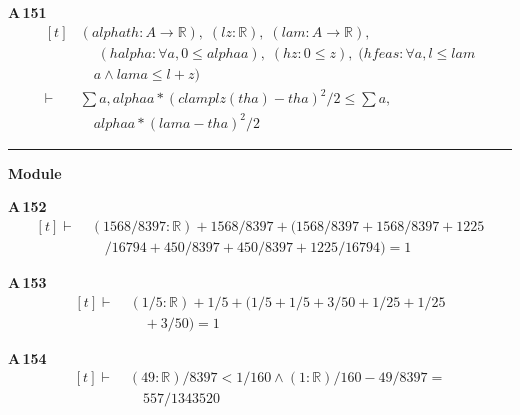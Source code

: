 \noindent\textbf{A\,151}\quad{}
{\footnotesize\[ \begin{aligned}[t]
&(\mathit{alpha} \mathit{th} : \mathit{A} \to \mathbb{R} ),\; (\mathit{l} \mathit{z} : \mathbb{R} ),\; (\mathit{lam} : \mathit{A} \to \mathbb{R} ),\\
&\quad \; (\mathit{halpha} : \forall \mathit{a}, 0 \leq \mathit{alpha} \mathit{a}),\; (\mathit{hz} : 0 \leq \mathit{z}),\; (\mathit{hfeas} : \forall \mathit{a}, \mathit{l} \leq \mathit{lam}\\
&\quad \mathit{a} \wedge \mathit{lam} \mathit{a} \leq \mathit{l} + \mathit{z})\\
\vdash\;&\textstyle\sum \mathit{a}, \mathit{alpha} \mathit{a} * (\mathit{clamp} \mathit{l} \mathit{z} (\mathit{th} \mathit{a}) - \mathit{th} \mathit{a}) ^{2} / 2 \leq \textstyle\sum \mathit{a},\\
&\quad \mathit{alpha} \mathit{a} * (\mathit{lam} \mathit{a} - \mathit{th} \mathit{a}) ^{2} / 2
\end{aligned} \]}

\vspace{4pt}\noindent\rule{\columnwidth}{0.4pt}\par\vspace{2pt}
\noindent\textbf{Module }\par\vspace{3pt}

\noindent\textbf{A\,152}\quad{}
{\footnotesize\[ \begin{aligned}[t]
\vdash\;&(1568/8397 : \mathbb{R} ) + 1568/8397 + (1568/8397 + 1568/8397 + 1225\\
&\quad /16794 + 450/8397 + 450/8397 + 1225/16794) = 1
\end{aligned} \]}

\noindent\textbf{A\,153}\quad{}
{\footnotesize\[ \begin{aligned}[t]
\vdash\;&(1/5 : \mathbb{R} ) + 1/5 + (1/5 + 1/5 + 3/50 + 1/25 + 1/25\\
&\quad + 3/50) = 1
\end{aligned} \]}

\noindent\textbf{A\,154}\quad{}
{\footnotesize\[ \begin{aligned}[t]
\vdash\;&(49:\mathbb{R} )/8397 < 1/160 \wedge (1:\mathbb{R} )/160 - 49/8397 =\\
&\quad 557/1343520
\end{aligned} \]}

